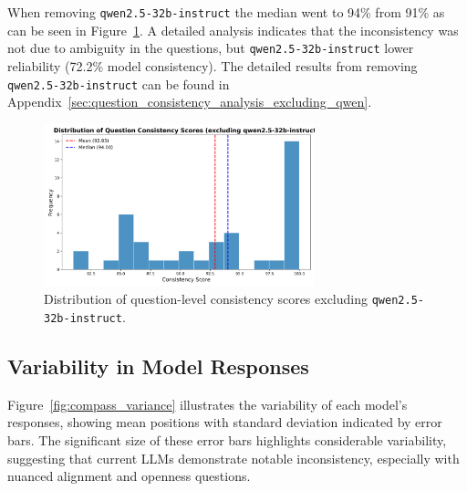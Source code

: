 When removing \texttt{qwen2.5-\allowbreak 32b-\allowbreak instruct} the median went to 94\% from 91\% as can be seen in Figure~\ref{fig:question_consistency_histogram_exclude_qwen}. A detailed analysis indicates that the inconsistency was not due to ambiguity in the questions, but \texttt{qwen2.5-\allowbreak 32b-\allowbreak instruct} lower reliability (72.2\% model consistency). The detailed results from removing \texttt{qwen2.5-\allowbreak 32b-\allowbreak instruct} can be found in Appendix~\ref{sec:question_consistency_analysis_excluding_qwen}.

\begin{figure}[htbp]
    \centering
    \includegraphics[width=0.7\textwidth]{figures/histogram_question_consistency_excluding_qwen2.5-32b-instruct.png}
    \caption{Distribution of question-level consistency scores excluding \texttt{qwen2.5-32b-instruct}.}
    \label{fig:question_consistency_histogram_exclude_qwen}
\end{figure}

\subsection{Variability in Model Responses}

Figure~\ref{fig:compass_variance} illustrates the variability of each model's responses, showing mean positions with standard deviation indicated by error bars. The significant size of these error bars highlights considerable variability, suggesting that current LLMs demonstrate notable inconsistency, especially with nuanced alignment and openness questions.

